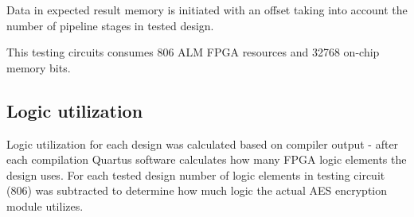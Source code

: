 Data in expected result memory is initiated with an offset taking into account the number of pipeline stages in tested design.

This testing circuits consumes 806 ALM FPGA resources and 32768 on-chip memory bits.



\subsection{Logic utilization}
Logic utilization for each design was calculated based on compiler output - after each compilation Quartus software calculates how many FPGA logic elements the design uses. For each tested design number of logic elements in testing circuit (806) was subtracted to determine how much logic the actual AES encryption module utilizes.




